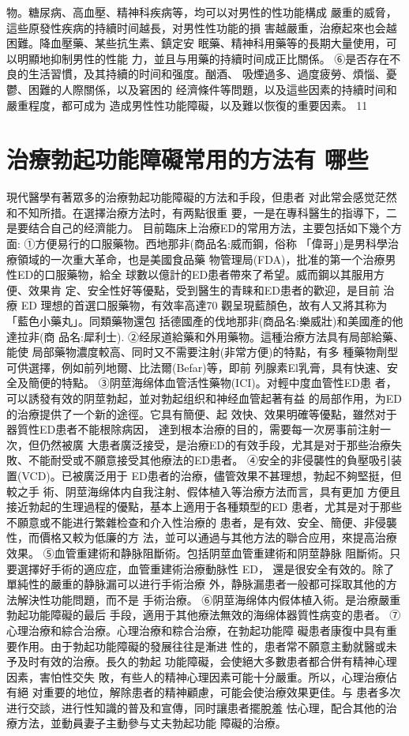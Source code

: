 \documentclass[12pt,UTF8]{ctexbook}
\begin{document}
物。糖尿病、高血壓、精神科疾病等，均可以对男性的性功能構成
嚴重的威脅，這些原發性疾病的持續时间越長，对男性性功能的損
害越嚴重，治療起來也会越困難。降血壓藥、某些抗生素、鎮定安
眠藥、精神科用藥等的長期大量使用，可以明顯地抑制男性的性能
力，並且与用藥的持續时间成正比關係。
⑥是否存在不良的生活習慣，及其持續的时间和强度。酗酒、
吸煙過多、過度疲勞、煩惱、憂鬱、困難的人際關係，以及窘困的
经濟條件等問題，以及這些因素的持續时间和嚴重程度，都可成为
造成男性性功能障礙，以及難以恢復的重要因素。
11\section{治療勃起功能障礙常用的方法有
哪些}
現代醫學有著眾多的治療勃起功能障礙的方法和手段，但患者
对此常会感觉茫然和不知所措。在選擇治療方法时，有两點很重
要，一是在專科醫生的指導下，二是要结合自己的经濟能力。
目前臨床上治療ED的常用方法，主要包括如下幾个方面:
①方便易行的口服藥物。西地那非(商品名:威而鋼，俗称
「偉哥」)是男科學治療領域的一次重大革命，也是美國食品藥
物管理局(FDA)，批准的第一个治療男性ED的口服藥物，給全
球數以億計的ED患者帶來了希望。威而鋼以其服用方便、效果肯
定、安全性好等優點，受到醫生的青睐和ED患者的歡迎，是目前
治療 ED 理想的首選口服藥物，有效率高達70%
觀呈現藍顏色，故有人又將其称为「藍色小藥丸」。同類藥物還包
括德國產的伐地那非(商品名:樂威壯)和美國產的他達拉非(商
品名:犀利士).
②经尿道給藥和外用藥物。這種治療方法具有局部給藥、能使
局部藥物濃度較高、同时又不需要注射(非常方便)的特點，有多
種藥物劑型可供選擇，例如前列地爾、比法爾(Befar)等，即前
列腺素El乳膏，具有快速、安全及簡便的特點。
③阴莖海绵体血管活性藥物(ICI)。对輕中度血管性ED患
者，可以誘發有效的阴莖勃起，並对勃起组织和神经血管起著有益
的局部作用，为ED的治療提供了一个新的途徑。它具有簡便、起
效快、效果明確等優點，雖然对于器質性ED患者不能根除病因，
達到根本治療的目的，需要每一次房事前注射一次，但仍然被廣
大患者廣泛接受，是治療ED的有效手段，尤其是对于那些治療失
敗、不能耐受或不願意接受其他療法的ED患者。
④安全的非侵襲性的負壓吸引装置(VCD)。已被廣泛用于
ED患者的治療，儘管效果不甚理想，勃起不夠堅挺，但較之手
術、阴莖海绵体内自我注射、假体植入等治療方法而言，具有更加
方便且接近勃起的生理過程的優點，基本上適用于各種類型的ED
患者，尤其是对于那些不願意或不能进行繁雜检查和介入性治療的
患者，是有效、安全、簡便、非侵襲性，而價格又較为低廉的方
法，並可以通過与其他方法的聯合应用，來提高治療效果。
⑤血管重建術和静脉阻斷術。包括阴莖血管重建術和阴莖静脉
阻斷術。只要選擇好手術的適应症，血管重建術治療動脉性 ED，
還是很安全有效的。除了單純性的嚴重的静脉漏可以进行手術治療
外，静脉漏患者一般都可採取其他的方法解決性功能問題，而不是
手術治療。
⑥阴莖海绵体内假体植入術。是治療嚴重勃起功能障礙的最后
手段，適用于其他療法無效的海绵体器質性病变的患者。
⑦心理治療和綜合治療。心理治療和粽合治療，在勃起功能障
礙患者康復中具有重要作用。由于勃起功能障礙的發展往往是漸进
性的，患者常不願意主動就醫或未予及时有效的治療。長久的勃起
功能障礙，会使絕大多數患者都合併有精神心理因素，害怕性交失
敗，有些人的精神心理因素可能十分嚴重。所以，心理治療佔有絕
对重要的地位，解除患者的精神顧慮，可能会使治療效果更佳。与
患者多次进行交談，进行性知識的普及和宣傳，同时讓患者擺脫羞
怯心理，配合其他的治療方法，並動員妻子主動參与丈夫勃起功能
障礙的治療。
\end{document}
